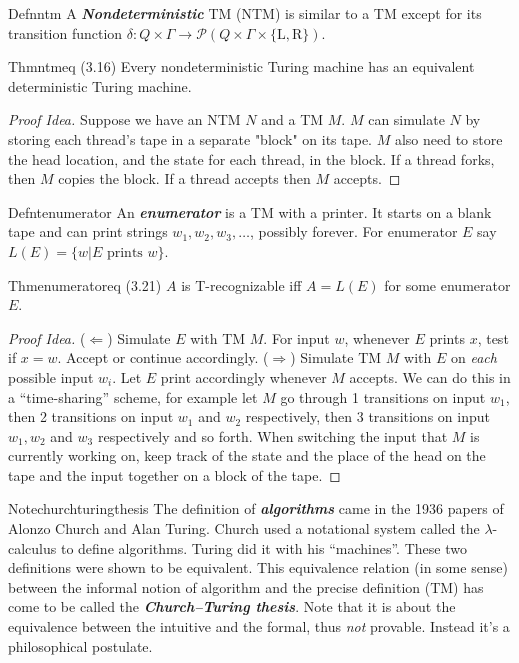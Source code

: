 \begin{reference}{Defn}{ntm}
  A \textbf{\textit{Nondeterministic}} TM (NTM) is similar to a TM except for its transition function $\delta:Q\times \Gamma\to \mathcal{P}(Q\times \Gamma\times\{\mathrm{L,R}\}).$
\end{reference}

\begin{reference}{Thm}{ntmeq}
  (3.16) Every nondeterministic Turing machine has an equivalent deterministic Turing machine.
\end{reference}

\begin{proof}[Proof Idea]
  Suppose we have an NTM $N$ and a TM $M$. $M$ can simulate $N$ by storing each thread's tape in a separate "block" on its tape. $M$ also need to store the head location, and the state for each thread, in the block. If a thread forks, then $M$ copies the block. If a thread accepts then $M$ accepts.
\end{proof}

\begin{reference}{Defn}{tenumerator}
  An \textbf{\textit{enumerator}} is a TM with a printer. It starts on a blank tape and can print strings $w_1,w_2,w_3,\dots$, possibly forever. For enumerator $E$ say $L(E)=\{w|E\text{ prints }w\}$.
\end{reference}

\begin{reference}{Thm}{enumeratoreq}
  (3.21) $A$ is T-recognizable iff $A=L(E)$ for some enumerator $E$.
\end{reference}

\begin{proof}[Proof Idea]
  ($\Leftarrow$) Simulate $E$ with TM $M$. For input $w$, whenever $E$ prints $x$, test if $x=w$. Accept or continue accordingly.\newline
  ($\Rightarrow$) Simulate TM $M$ with $E$ on \textit{each} possible input $w_i$. Let $E$ print accordingly whenever $M$ accepts. We can do this in a ``time-sharing'' scheme, for example let $M$ go through 1 transitions on input $w_1$, then 2 transitions on input $w_1$ and $w_2$ respectively, then 3 transitions on input $w_1, w_2$ and $w_3$ respectively and so forth. When switching the input that $M$ is currently working on, keep track of the state and the place of the head on the tape and the input together on a block of the tape.
\end{proof}

\begin{reference}{Note}{churchturingthesis}
  The definition of \textbf{\textit{algorithms}} came in the 1936 papers of Alonzo Church and Alan Turing. Church used a notational system called the $\lambda$-calculus to define algorithms. Turing did it with his “machines”. These two definitions were shown to be equivalent. This equivalence relation (in some sense) between the informal notion of algorithm and the precise definition (TM) has come to be called the \textbf{\textit{Church–Turing thesis}}. Note that it is about the equivalence between the intuitive and the formal, thus \textit{not} provable. Instead it’s a philosophical postulate.
\end{reference}

